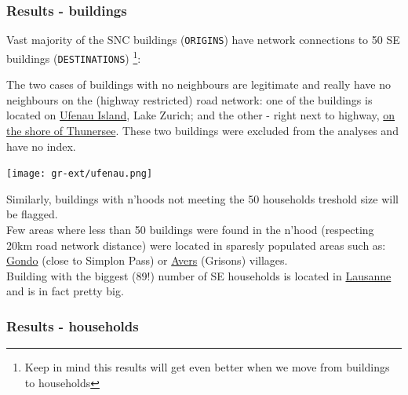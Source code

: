 \documentclass[a4paper, notitlepage, fleqn]{article} %
\begin{document}
\subsubsection{Results - buildings}

Vast majority of the SNC buildings (\texttt{ORIGINS}) have network connections to 50 SE buildings (\texttt{DESTINATIONS})
\footnote{Keep in mind this results will get even better when we move from buildings to households}: 
\begin{stlog}\end{stlog}
The two cases of buildings with no neighbours are legitimate and really have no neighbours on the (highway restricted) road network: 
	one of the buildings is located on \href{https://goo.gl/maps/L5sLmrMXZap}{Ufenau Island}, Lake Zurich; 
	and the other - right next to highway,  \href{https://goo.gl/maps/fxPCBS5TmEQ2}{on the shore of Thunersee}. 
	These two buildings were excluded from the analyses and have no index. \\
	
\begin{center}
\texttt{[image: gr-ext/ufenau.png]} 
\end{center}

Similarly, buildings with n'hoods not meeting the 50 households treshold size will be flagged. \\

Few areas where less than 50 buildings were found in the n'hood (respecting 20km road network distance) were located in sparesly populated areas such as:
	\href{https://goo.gl/maps/BXbgyCYtuGU2}{Gondo} (close to Simplon Pass) or \href{https://goo.gl/maps/mg15ptJPVTJ2}{Avers} (Grisons) villages. \\

Building with the biggest (89!) number of SE households is located in \href{https://goo.gl/maps/oFeag8mQFdS2}{Lausanne} and is in fact pretty big.
\subsubsection{Results - households}
\end{document}
